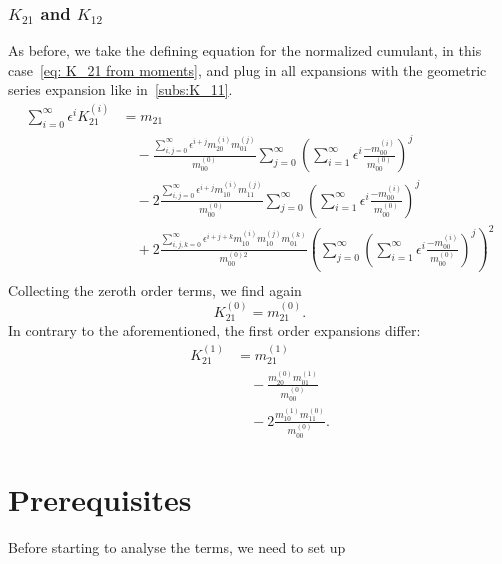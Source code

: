 \documentclass{article}
\begin{document}
\subsubsection{\texorpdfstring{$K_{21}$}{K 21} and \texorpdfstring{$K_{12}$}{K 12}}
\label{subs:K_21}
As before, we take the defining equation for the normalized cumulant, in this case~\eqref{eq: K_21 from moments}, and plug in all expansions with the geometric series expansion like in~\ref{subs:K_11}.
\begin{equation}
  \begin{aligned}
    \sum_{i=0}^\infty \epsilon^i K_{21}^{(i)}
    & = m_{21}
    \\ &\quad
    - \frac{\sum_{i,j=0}^\infty \epsilon^{i+j} m_{20}^{(i)} m_{01}^{(j)}}{m_{00}^{(0)}}
      \sum_{j=0}^\infty {\left(\sum_{i=1}^\infty \epsilon^i \frac{ - m_{00}^{(i)}}{ m_{00}^{(0)}}\right)}^j
    \\ &\quad
     - 2\frac{\sum_{i,j=0}^\infty \epsilon^{i+j} m_{10}^{(i)} m_{11}^{(j)}}{m_{00}^{(0)}}
      \sum_{j=0}^\infty {\left(\sum_{i=1}^\infty \epsilon^i \frac{ - m_{00}^{(i)}}{ m_{00}^{(0)}}\right)}^j
     \\ &\quad
     + 2\frac{\sum_{i,j,k=0}^\infty \epsilon^{i+j+k} m_{10}^{(i)} m_{10}^{(j)} m_{01}^{(k)}}{m_{00}^{(0)2}}
      {\left(
        \sum_{j=0}^\infty {\left(\sum_{i=1}^\infty \epsilon^i \frac{ - m_{00}^{(i)}}{ m_{00}^{(0)}}\right)}^j
      \right)}^2\\
   \end{aligned}
\end{equation}
Collecting the zeroth order terms, we find again
\begin{equation}
  K_{21}^{(0)} = m_{21}^{(0)}.
\end{equation}
In contrary to the aforementioned, the first order expansions differ:
\begin{equation}
  \begin{aligned}
    K_{21}^{(1)} & = m_{21}^{(1)}
    \\ &\quad
    - \frac{m_{20}^{(0)} m_{01}^{(1)}}{m_{00}^{(0)}}
    \\ &\quad
    - 2\frac{m_{10}^{(1)} m_{11}^{(0)}}{m_{00}^{(0)}}.
  \end{aligned}
\end{equation}

\section{Prerequisites}
\label{sec:Prerequisites}
Before starting to analyse the terms, we need to set up
\end{document}
